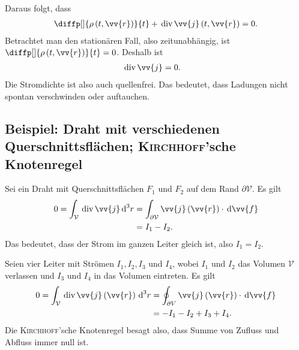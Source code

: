 \documentclass[a4paper,12pt]{article}
\newcommand{\td}{\,\text{d}}
\numberwithin{equation}{section}
\begin{document}
Daraus folgt, dass
\begin{align} 
        \diffp[]{\rho \left(t,\vv{r}\right)}{t}+\,\text{div}\,\vv{j}\left(t,\vv{r}\right)=0
.\end{align} 
Betrachtet man den stationären Fall, also zeitunabhängig, ist $\diffp[]{\rho \left(t,\vv{r}\right)}{t}=0$. Deshalb ist
\begin{align} 
        \,\text{div}\,\vv{j}&=0
.\end{align} 
Die Stromdichte ist also auch quellenfrei. Das bedeutet, dass Ladungen nicht spontan verschwinden oder auftauchen.

\subsection{Beispiel: Draht mit verschiedenen Querschnittsflächen; \textsc{Kirchhoff}'sche Knotenregel}
Sei ein Draht mit Querschnittsflächen $F_1$ und $F_2$ auf dem Rand $\partial \mathcal{V}$. Es gilt 
\begin{align} 
        0=\int_{\mathcal{V}}^{}\,\text{div}\,\vv{j}\td ^3r&=\int_{\partial \mathcal{V}}^{}\vv{j}\left(\vv{r}\right)\cdot \td \vv{f}\\
                                                          &=I_1-I_2
.\end{align} 
Das bedeutet, dass der Strom im ganzen Leiter gleich ist, also $I_1=I_2$.\par
Seien vier Leiter mit Strömen $I_1,I_2,I_3$ und $I_4$, wobei $I_1$ und $I_2$ das Volumen $\mathcal{V}$ verlassen und $I_3$ und $I_4$ in das Volumen eintreten. Es gilt
\begin{align} 
        0=\int_{\mathcal{V}}^{}\,\text{div}\,\vv{j}\left(\vv{r}\right)\td ^3r&=\oint_{\partial V}^{}\vv{j}\left(\vv{r}\right)\cdot \td \vv{f}\\
                                                                             &=-I_1-I_2+I_3+I_4
.\end{align} 
Die \textsc{Kirchhoff}'sche Knotenregel besagt also, dass Summe von Zufluss und Abfluss immer null ist.
\end{document}
